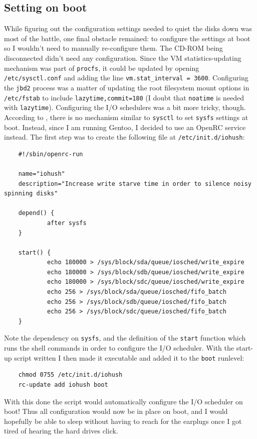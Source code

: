 \documentclass{article}
\begin{document}
\subsection{Setting on boot}

While figuring out the configuration settings needed to quiet the disks down was most of the battle, one final obstacle remained: to configure the settings at boot so I wouldn't need to manually re-configure them.  The CD-ROM being disconnected didn't need any configuration.  Since the VM statistics-updating mechanism was part of \texttt{procfs}, it could be updated by opening \texttt{/etc/sysctl.conf} and adding the line \texttt{vm.stat_interval = 3600}.  Configuring the \texttt{jbd2} process was a matter of updating the root filesystem mount options in \texttt{/etc/fstab} to include \texttt{lazytime,commit=180} (I doubt that \texttt{noatime} is needed with \texttt{lazytime}).  Configuring the I/O schedulers was a bit more tricky, though.  According to , there is no mechanism similar to \texttt{sysctl} to set \texttt{sysfs} settings at boot.  Instead, since I am running Gentoo, I decided to use an OpenRC service instead.  The first step was to create the following file at \texttt{/etc/init.d/iohush}:
\begin{verbatim}
	#!/sbin/openrc-run

	name="iohush"
	description="Increase write starve time in order to silence noisy spinning disks"

	depend() {
	        after sysfs
	}

	start() {
	        echo 180000 > /sys/block/sda/queue/iosched/write_expire
	        echo 180000 > /sys/block/sdb/queue/iosched/write_expire
	        echo 180000 > /sys/block/sdc/queue/iosched/write_expire
	        echo 256 > /sys/block/sda/queue/iosched/fifo_batch
	        echo 256 > /sys/block/sdb/queue/iosched/fifo_batch
	        echo 256 > /sys/block/sdc/queue/iosched/fifo_batch
	}
\end{verbatim}
Note the dependency on \texttt{sysfs}, and the definition of the \texttt{start} function which runs the shell commands in order to configure the I/O scheduler.  With the start-up script written I then made it executable and added it to the \texttt{boot} runlevel:
\begin{verbatim}
	chmod 0755 /etc/init.d/iohush
	rc-update add iohush boot
\end{verbatim}
With this done the script would automatically configure the I/O scheduler on boot!  Thus all configuration would now be in place on boot, and I would hopefully be able to sleep without having to reach for the earplugs once I got tired of hearing the hard drives click.
\end{document}
